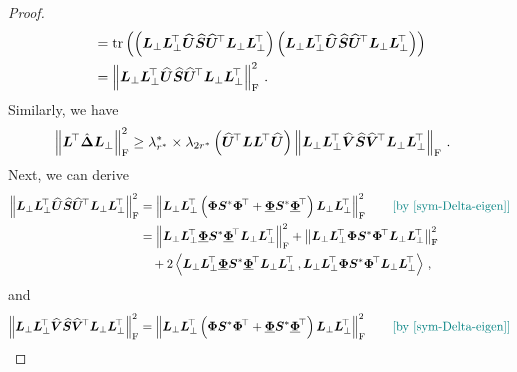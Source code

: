 \begin{proof}
\begin{align*}
    & = \operatorname{tr}\left(\left(\bm L_\perp \bm L_\perp^{\!\top} \widehat{\bm U}\widehat{\bm S}\widehat{\bm U}^{\!\top}\bm L_\perp \bm L_\perp^{\!\top}\right)\left(\bm L_\perp \bm L_\perp^{\!\top} \widehat{\bm U}\widehat{\bm S}\widehat{\bm U}^{\!\top}\bm L_\perp \bm L_\perp^{\!\top}\right)\right)\\
    & = \left\|\bm L_\perp \bm L_\perp^{\!\top} \widehat{\bm U}\widehat{\bm S}\widehat{\bm U}^{\!\top}\bm L_\perp \bm L_\perp^{\!\top}\right\|^2_{\rm F}\,.
\end{align*}
Similarly, we have
\begin{align*}
    \left\|\bm L^{\!\top}\hat{\bm \Delta}\bm L_\perp\right\|^2_{\rm F} & \geq \lambda^*_{r^*}\times\lambda_{2r^*}\left(\widehat{\bm U}^{\!\top}\bm L \bm L^{\!\top} \widehat{\bm U}\right)\left\|\bm L_\perp \bm L_\perp^{\!\top} \widehat{\bm V}\widehat{\bm S}\widehat{\bm V}^{\!\top}\bm L_\perp \bm L_\perp^{\!\top}\right\|_{\rm F}\,.
\end{align*}
Next, we can derive
\begin{align*}
    \left\|\bm L_\perp \bm L_\perp^{\!\top} \widehat{\bm U}\widehat{\bm S}\widehat{\bm U}^{\!\top}\bm L_\perp \bm L_\perp^{\!\top}\right\|^2_{\rm F} & = \left\|\bm L_\perp \bm L_\perp^{\!\top} \left(\bm \Phi \bm S^* \bm \Phi^{\!\top} + \underline{\bm \Phi} \bm S^* \underline{\bm \Phi}^{\!\top}\right)\bm L_\perp \bm L_\perp^{\!\top}\right\|^2_{\rm F} \tag*{\color{teal}[by \cref{sym-Delta-eigen}]}\\
    & = \left\|\bm L_\perp \bm L_\perp^{\!\top} \underline{\bm \Phi} \bm S^* \underline{\bm \Phi}^{\!\top}\bm L_\perp \bm L_\perp^{\!\top}\right\|^2_{\rm F} + \left\|\bm L_\perp \bm L_\perp^{\!\top} \bm \Phi \bm S^* \bm \Phi^{\!\top}\bm L_\perp \bm L_\perp^{\!\top}\right\|^2_{\rm F}\\
    &\quad+2\left\langle \bm L_\perp \bm L_\perp^{\!\top} \underline{\bm \Phi} \bm S^* \underline{\bm \Phi}^{\!\top}\bm L_\perp \bm L_\perp^{\!\top}\,,\bm L_\perp \bm L_\perp^{\!\top} \bm \Phi \bm S^* \bm \Phi^{\!\top}\bm L_\perp \bm L_\perp^{\!\top}\right\rangle\,,
\end{align*}
and
\begin{align*}
    \left\|\bm L_\perp \bm L_\perp^{\!\top} \widehat{\bm V}\widehat{\bm S}\widehat{\bm V}^{\!\top}\bm L_\perp \bm L_\perp^{\!\top}\right\|^2_{\rm F} & = \left\|\bm L_\perp \bm L_\perp^{\!\top} \left(\bm \Phi \bm S^* \bm \Phi^{\!\top} + \underline{\bm \Phi} \bm S^* \underline{\bm \Phi}^{\!\top}\right)\bm L_\perp \bm L_\perp^{\!\top}\right\|^2_{\rm F} \tag*{\color{teal}[by \cref{sym-Delta-eigen}]}\\

\end{align*}
\end{proof}
